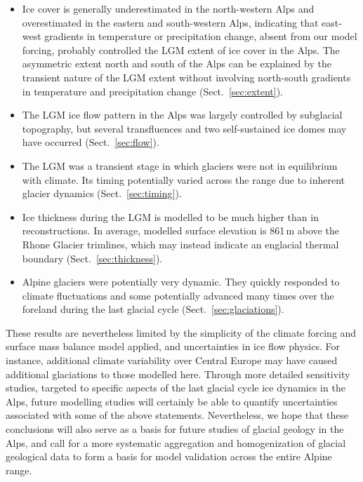 \documentclass[tc, manuscript]{copernicus}
\begin{document}
    \begin{itemize}
      \item Ice cover is generally underestimated in the north-western Alps and
            overestimated in the eastern and south-western Alps, indicating
            that east-west
            gradients in temperature or precipitation change, absent from our
            model forcing, probably controlled the LGM extent of ice cover in
            the Alps. The asymmetric extent north and south of the Alps
            can be explained by the transient nature of the LGM extent without
            involving north-south gradients in temperature and precipitation
            change (Sect.~\ref{sec:extent}).
      \item The LGM ice flow pattern in the Alps was largely controlled by
            subglacial topography, but several transfluences and two
            self-sustained ice domes may have occurred (Sect.~\ref{sec:flow}).
      \item The LGM was a transient stage in which glaciers were not in
            equilibrium with climate. Its timing potentially varied across the
            range due to inherent glacier dynamics (Sect.~\ref{sec:timing}).
      \item Ice thickness during the LGM is modelled to be much higher than in
            reconstructions. In average, modelled surface elevation is 861\,m
            above the Rhone Glacier trimlines, which may instead indicate an
            englacial thermal boundary (Sect.~\ref{sec:thickness}).
      \item Alpine glaciers were potentially very dynamic. They quickly
            responded to climate fluctuations and some potentially advanced
            many times over the foreland during the last glacial cycle
            (Sect.~\ref{sec:glaciations}).
    \end{itemize}

    These results are nevertheless limited by the simplicity of the climate
    forcing and surface mass balance model applied, and uncertainties in ice
    flow physics. For instance, additional climate variability over Central
    Europe may have caused additional glaciations to those modelled here.
    Through more detailed sensitivity studies, targeted to
    specific aspects of the last glacial cycle ice dynamics in the Alps, future
    modelling studies will certainly be able to quantify uncertainties
    associated with some of the above statements. Nevertheless, we hope that
    these conclusions will also serve as a basis for future studies of glacial
    geology in the Alps, and call for a more systematic aggregation and
    homogenization of glacial geological data to form a basis for model
    validation across the entire Alpine range.
\end{document}
